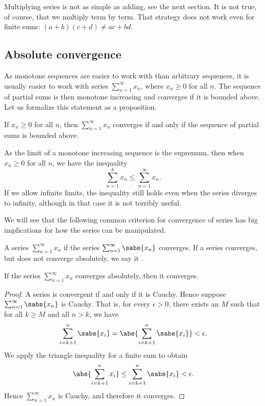 Multiplying series is not as simple as adding, see the next
section.
It is not true, of course, that we multiply
term by term.  That strategy does not work even for finite sums:
$(a+b)(c+d) \not= ac+bd$.

\subsection{Absolute convergence}

As monotone sequences are easier to work with than arbitrary sequences, it
is usually easier to work with series $\sum_{n=1}^\infty x_n$, where $x_n \geq 0$ for
all $n$.  The sequence of partial sums is then monotone increasing
and converges if it is bounded above.
Let us formalize this statement as a proposition.

\begin{prop}
If $x_n \geq 0$ for all $n$, then $\sum_{n=1}^\infty x_n$ converges if and only if
the sequence of partial sums is bounded above.
\end{prop}

As the limit of a monotone increasing sequence is the supremum, then
when $x_n \geq 0$ for all $n$, we have the
inequality
\begin{equation*}
\sum_{n=1}^k x_n \leq
\sum_{n=1}^\infty x_n .
\end{equation*}
If we allow infinite limits, the inequality still
holds even when the series diverges to infinity, although in that case it is not
terribly useful.

We will see that the following common criterion for convergence of series 
has big implications for how the series can be manipulated.

\begin{defn}
A series $\sum_{n=1}^\infty x_n$
\emph{} if
the series $\sum_{n=1}^\infty \sabs{x_n}$ converges.
If a series converges, but does not converge absolutely, we say
it \emph{}.
\end{defn}

\begin{prop}
If the series $\sum_{n=1}^\infty x_n$ converges absolutely, then it converges.
\end{prop}

\begin{proof}
A series is convergent if and only if it is Cauchy.  Hence
suppose $\sum_{n=1}^\infty \sabs{x_n}$ is Cauchy.  That is, for every $\epsilon > 0$,
there exists an $M$ such that for all $k \geq M$ and all $n > k$, we have 
\begin{equation*}
\sum_{i=k+1}^n \sabs{x_i} 
=
\abs{ \sum_{i=k+1}^n \sabs{x_i} }
<
\epsilon .
\end{equation*}
We apply the triangle inequality for a finite sum to obtain
\begin{equation*}
\abs{ \sum_{i=k+1}^n x_i }
\leq
\sum_{i=k+1}^n \sabs{x_i}
<
\epsilon .
\end{equation*}
Hence $\sum_{n=1}^\infty x_n$ is Cauchy, and therefore it converges.
\end{proof}

